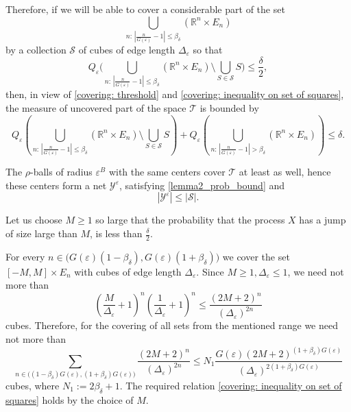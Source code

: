 \documentclass[12pt]{article}
\let\de\delta
\let\ep\varepsilon
\newcommand\ro{\rho}
\newcommand{\R}{\mathbb{R}}
\newcommand\SSS {\mathcal S}
\newcommand\TT{\mathcal T}
\newcommand\YY{\mathcal Y}
\let\le\leqslant
\let\ge\geqslant
\theoremstyle{definition}
\begin{document}
Therefore, if we will be able to cover a considerable part of the set
\[
     \bigcup_{n:\, |\frac{n}{G(\ep)} - 1|\le \beta_\delta} \left(\R^n\times E_n\right)
\]     
by a collection $\SSS$ of cubes of edge length $\Delta_\ep$ so that 
\begin{equation}\label{covering: inequality on set of squares}
            Q_\ep\Big(\bigcup_{n:\, |\frac{n}{G(\ep)} - 1| \le \beta_\delta} 
               \left(\R^n\times E_n \right)
            \setminus 
            \bigcup_{S\in \SSS} S \Big) \le \frac\de2,
\end{equation}
then, in view of \eqref{covering: threshold} and \eqref{covering: inequality on set of squares}, 
the measure of uncovered part of the space $\TT$ is bounded by 
\[
   Q_\ep\left(\bigcup_{n:\, |\frac{n}{G(\ep)} - 1|\le \beta_\delta} 
   \left( \R^n\times E_n\right) \setminus
   \bigcup_{S\in \SSS} S\right)  
    + 
    Q_\ep\left(\bigcup_{n:\, |\frac{n}{G(\ep)} - 1|>\beta_\delta} \left(\R^n\times E_n\right)
    \right) \le \de.
\]

The $\ro$-balls of radius $\ep^B$  with the same centers cover $\TT$ at least as well,
hence these centers form a net $\YY^\ep$, satisfying \eqref{lemma2_prob_bound} and
\[
            |\YY^\ep| \le |\SSS|.
\]       


Let us choose $M\ge 1$ so large that the probability that the process  $X$  has a jump of size large than
$M$, is less than $\tfrac\de2$.

For every $n \in \big(G(\ep)(1 - \beta_\de), G(\ep)(1 + \beta_\de)\big)$ we cover the set
$[-M,M]\times E_n$ with cubes of edge length $\Delta_\ep$. Since $M\ge 1, \Delta_\ep\le 1$,
we need not more than
\[
    \left( \frac{M}{\Delta_\ep} + 1\right)^n  \left( \frac{1}{\Delta_\ep}+1 \right)^{n}
    \le \frac{(2M+2)^n}{ (\Delta_\ep)^{2n} }
\]
cubes. Therefore, for the covering of all sets from the mentioned range we need not more than
\[  
            \sum_{n\in\big((1-\beta_\de)G(\ep), (1+\beta_\de)G(\ep)\big)} \frac{(2M+2)^n}{(\Delta_\ep)^{2n}} \le N_1\frac{G(\ep)(2M+2)^{(1+\beta_\de)G(\ep)}}{(\Delta_\ep)^{2(1+\beta_\de)G(\ep)}}
\]
cubes, where $N_1:=2\beta_\delta+1$. 
The required relation \eqref{covering: inequality on set of squares}
holds by the choice of $M$.
       
\end{document}
